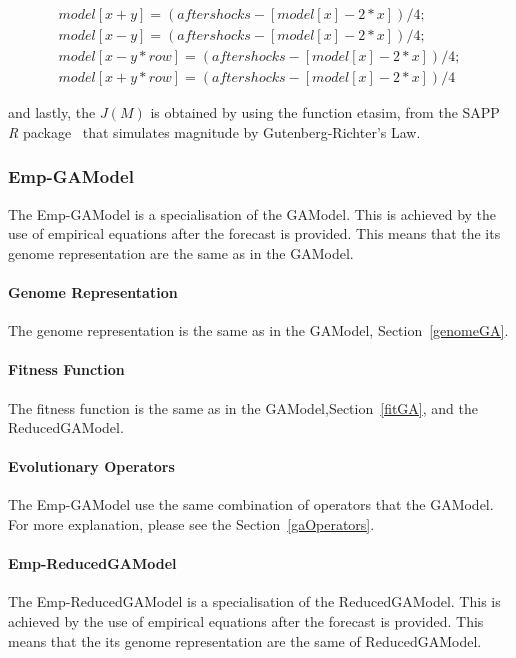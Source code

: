 \begin{subequations}
\begin{gather*}
        model[x+y] = (aftershocks-[model[x]-2*x])/4;\\
        model[x-y] = (aftershocks-[model[x]-2*x])/4;\\
        model[x-y*row] = (aftershocks-[model[x]-2*x])/4;\\
        model[x+y*row] = (aftershocks-[model[x]-2*x])/4
\end{gather*}
\end{subequations}


and lastly, the $J(M)$ is obtained by using the function etasim, from the SAPP \textit{R} package~\cite{webSapp} that simulates magnitude by Gutenberg-Richter’s Law.


\subsubsection{Emp-GAModel}\label{emp-gamodel}
The Emp-GAModel is a specialisation of the GAModel. This is achieved by the use of empirical equations after the forecast is provided. This means that the its genome representation are the same as in the GAModel.
\paragraph{Genome Representation}
The genome representation is the same as in the GAModel, Section~\ref{genomeGA}.

\paragraph{Fitness Function}
The fitness function is the same as in the GAModel,Section~\ref{fitGA}, and the ReducedGAModel.
\paragraph{Evolutionary Operators}
The Emp-GAModel use the same combination of operators that the GAModel. For more explanation, please see the Section~\ref{gaOperators}.

\paragraph{Emp-ReducedGAModel}\label{emp-reducedgamodel}
The Emp-ReducedGAModel is a specialisation of the ReducedGAModel. This is achieved by the use of empirical equations after the forecast is provided. This means that the its genome representation are the same of ReducedGAModel.

